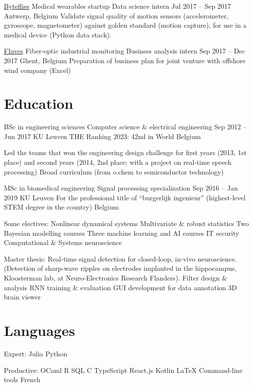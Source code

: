 \documentclass[a4]{article}
\begin{document}
\href{https://byteflies.com}{Byteflies}
Medical wearables startup
Data science intern
Jul 2017  –  Sep 2017
Antwerp, Belgium
Validate signal quality of motion sensors (accelerometer, gyroscope, magnetometer) against golden standard (motion capture), for use in a medical device (Python data stack).

\href{https://www.fluves.com}{Fluves}
Fiber-optic industrial monitoring
Business analysis intern
Sep 2017  –  Dec 2017
Ghent, Belgium
Preparation of business plan for joint venture with offshore wind company (Excel)


\section{Education}

BSc in engineering sciences
Computer science \& electrical engineering
Sep 2012  –  Jun 2017
KU Leuven
THE Ranking 2023: 42nd in World
Belgium

Led the teams that won the engineering design challenge for first years (2013, 1st place) and second years (2014, 2nd place; with a project on real-time speech processing)
Broad curriculum (from o.chem to semiconductor technology)


MSc in biomedical engineering
Signal processing specialization
Sep 2016  –  Jan 2019
KU Leuven
For the professional title of “burgerlijk ingenieur”  (highest-level STEM degree in the country)
Belgium

Some electives:
Nonlinear dynamical systems
Multivariate \& robust statistics
Two Bayesian modelling  courses
Three machine learning and AI courses
IT security
Computational \& Systems neuroscience

Master thesis:  Real-time signal detection for closed-loop, in-vivo neuroscience. (Detection of sharp-wave ripples on electrodes implanted in the hippocampus, Kloosterman lab, at Neuro-Electronics Research Flanders).
Filter design \& analysis
RNN training \& evaluation
GUI development for data annotation
3D brain viewer


\section{Languages}
Expert:
Julia
Python

Productive:
OCaml
R
SQL
C
TypeScript
React.js
Kotlin
LaTeX
Command-line tools
French
\end{document}
